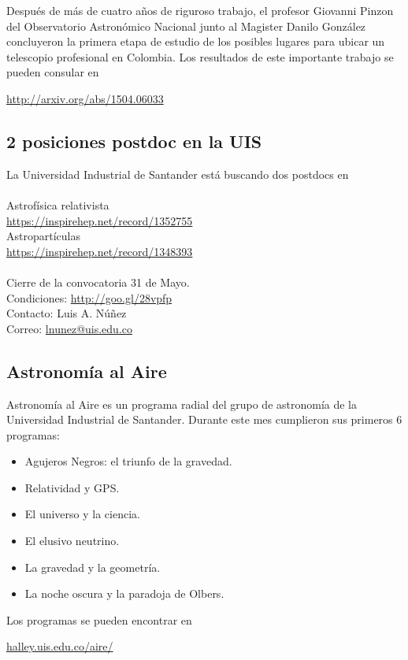 \documentclass{book}
\begin{document}
Después de más de cuatro años de riguroso trabajo, el profesor Giovanni Pinzon del Observatorio Astronómico Nacional junto al Magister Danilo González concluyeron la primera etapa de estudio de los posibles lugares para ubicar un telescopio profesional en Colombia. Los resultados de este importante trabajo se pueden consular en
\begin{center}
\url{http://arxiv.org/abs/1504.06033}
\end{center}


\subsection{2 posiciones postdoc en la UIS}
La Universidad Industrial de Santander está buscando dos postdocs en\\
\\
Astrofísica relativista\\ \url{https://inspirehep.net/record/1352755}\\
Astropartículas\\ \url{https://inspirehep.net/record/1348393}
\\
\\
Cierre de la convocatoria 31 de Mayo. \\
Condiciones: \url{http://goo.gl/28vpfp}
\\
Contacto: Luis A. Núñez \\
Correo: \url{lnunez@uis.edu.co}

\subsection{Astronomía al Aire}
Astronomía al Aire es un programa radial del grupo de astronomía de la Universidad Industrial de Santander. Durante este mes cumplieron sus primeros 6 programas: 
\begin{itemize}
\item Agujeros Negros: el triunfo de la gravedad.
\item Relatividad y GPS.
\item El universo y la ciencia.
\item El elusivo neutrino.
\item La gravedad y la geometría.
\item La noche oscura y la paradoja de Olbers.
\end{itemize}
Los programas se pueden encontrar en
\begin{center}
\url{halley.uis.edu.co/aire/}
\end{center}
\newpage
\end{document}
